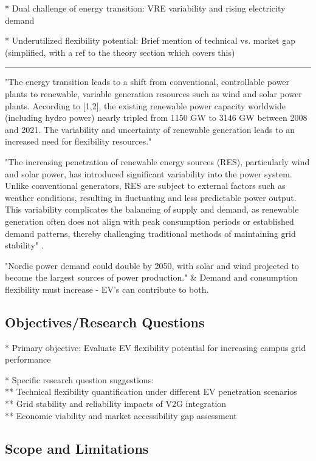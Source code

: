 * Dual challenge of energy transition: VRE variability and rising electricity demand

* Underutilized flexibility potential: Brief mention of technical vs. market gap (simplified, with a ref to the theory section which covers this)

\hrule
"The energy transition leads to a shift from conventional, controllable power plants to renewable, variable generation resources such as wind and solar power plants. According to [1,2], the existing renewable power capacity worldwide (including hydro power) nearly tripled from 1150 GW to 3146 GW between 2008 and 2021. The variability and uncertainty of renewable generation leads to an increased need for flexibility resources." \cite{lechl_review_2023}

"The increasing penetration of renewable energy sources (RES), particularly wind and solar power, has introduced significant variability into the power system. Unlike conventional generators, RES are subject to external factors such as weather conditions, resulting in fluctuating and less predictable power output. This variability complicates the balancing of supply and demand, as renewable generation often does not align with peak consumption periods or established demand patterns, thereby challenging traditional methods of maintaining grid stability" \cite{impram_challenges_2020}.

"Nordic power demand could double by 2050, with solar and wind projected to become the largest sources of power production." \& Demand and consumption flexibility must increase - EV's can contribute to both. \cite{noauthor_nordic_2023}


\subsection{Objectives/Research Questions}

* Primary objective: Evaluate EV flexibility potential for increasing campus grid performance

* Specific research question suggestions: \\
** Technical flexibility quantification under different EV penetration scenarios \\
** Grid stability and reliability impacts of V2G integration \\
** Economic viability and market accessibility gap assessment \\


\subsection{Scope and Limitations}


